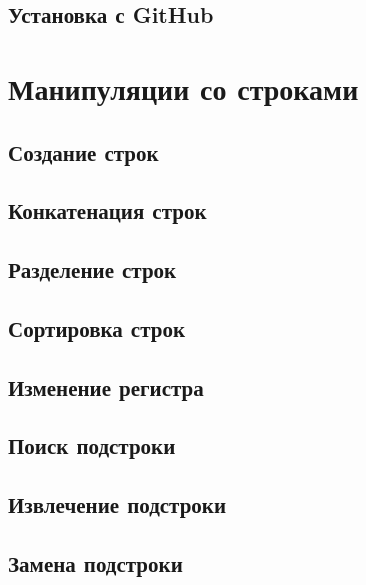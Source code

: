 \documentclass[
  letterpaper,
]{scrbook}
\theoremstyle{definition}
\theoremstyle{remark}
\begin{document}
\subsection{Установка с GitHub}\label{rstrings-packages-github}

\section{Манипуляции со строками}\label{rstrings-manipulations}

\subsection{Создание строк}\label{rstrings-manipulations-creation}

\subsection{Конкатенация строк}\label{rstrings-manipulations-concat}

\subsection{Разделение строк}\label{rstrings-split}

\subsection{Сортировка строк}\label{rstrings-manipulations-sort}

\subsection{Изменение регистра}\label{rstrings-manipulations-case}

\subsection{Поиск подстроки}\label{rstrings-manipulations-detect}

\subsection{Извлечение подстроки}\label{rstrings-manipulations-extract}

\subsection{Замена подстроки}\label{rstrings-manipulations-replace}
\end{document}
